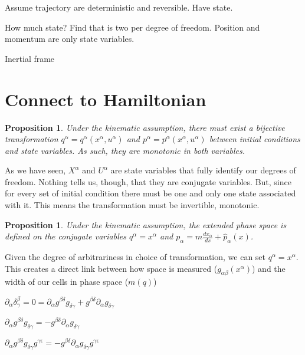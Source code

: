 \documentclass[aps,pra,10pt,twocolumn,floatfix,nofootinbib]{revtex4-1}
\newtheorem{prop}[thm]{Proposition}
\theoremstyle{definition}
\begin{document}



Assume trajectory are deterministic and reversible. Have state.

How much state? Find that is two per degree of freedom. Position and momentum are only state variables.

Inertial frame

\section{Connect to Hamiltonian}
\begin{prop}\label{continuousLabels}
Under the kinematic assumption, there must exist a bijective transformation $q^\alpha=q^\alpha(x^\alpha,u^\alpha)$ and $p^\alpha=p^\alpha(x^\alpha,u^\alpha)$ between initial conditions and state variables. As such, they are monotonic in both variables.
\end{prop}

As we have seen, $X^\alpha$ and $U^\alpha$ are state variables that fully identify our degrees of freedom. Nothing tells us, though, that
they are conjugate variables. But, since for every set of initial condition there must be one and only one state associated with it. This means the transformation must be invertible, monotonic.

\begin{prop}\label{continuousLabels}
Under the kinematic assumption, the extended phase space is defined on the conjugate variables $q^\alpha=x^\alpha$ and $p_\alpha=m\frac{dx_\alpha}{ds}+\hat{p}_\alpha(x)$.
\end{prop}

Given the degree of arbitrariness in choice of transformation, we can set $q^\alpha=x^\alpha$. This creates a direct link between how space is measured ($g_{\alpha\beta}(x^\alpha)$) and the width of our cells in phase space ($m(q)$)

$\partial_\alpha \delta^\beta_\gamma = 0 = \partial_\alpha g^{\beta\delta} g_{\delta\gamma} + g^{\beta\delta} \partial_\alpha g_{\delta\gamma}$

$\partial_\alpha g^{\beta\delta} g_{\delta\gamma} = - g^{\beta\delta} \partial_\alpha g_{\delta\gamma}$

$\partial_\alpha g^{\beta\delta} g_{\delta\gamma} g^{\gamma\epsilon} = - g^{\beta\delta} \partial_\alpha g_{\delta\gamma} g^{\gamma\epsilon}$
\end{document}
